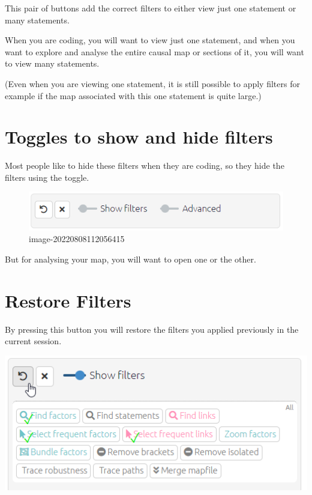 \documentclass[
]{book}
\begin{document}
This pair of buttons add the correct filters to either view just one statement or many statements.

When you are coding, you will want to view just one statement, and when you want to explore and analyse the entire causal map or sections of it, you will want to view many statements.

(Even when you are viewing one statement, it is still possible to apply filters for example if the map associated with this one statement is quite large.)

\hypertarget{toggles-to-show-and-hide-filters}{%
\section{Toggles to show and hide filters}\label{toggles-to-show-and-hide-filters}}

Most people like to hide these filters when they are coding, so they hide the filters using the toggle.

\begin{figure}
\centering
\includegraphics[width=6.77083in,height=\textheight]{_assets/image-20220808112056415.png}
\caption{image-20220808112056415}
\end{figure}

But for analysing your map, you will want to open one or the other.

\hypertarget{restore-filters}{%
\section{Restore Filters}\label{restore-filters}}

By pressing this button you will restore the filters you applied previously in the current session.

\includegraphics[width=6.77083in,height=\textheight]{_assets/image-20220808111332598.png}
\end{document}
